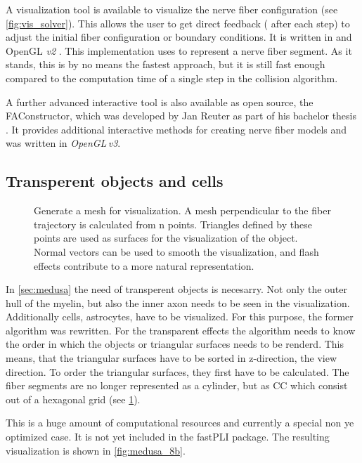 %
A visualization tool is available to visualize the nerve fiber configuration (see \cref{fig:vis_solver}).
This allows the user to get direct feedback (\eg{} after each step) to adjust the initial fiber configuration or boundary conditions.
It is written in \cpp{} and \ac{OpenGL} \textit{v2} \cite{isocpp, khronos}.
This implementation uses  to represent a nerve fiber segment.
As it stands, this is by no means the fastest approach, but it is still fast enough compared to the computation time of a single step in the collision algorithm.
\par
% 
A further advanced interactive tool is also available as open source, the FAConstructor, which was developed by Jan Reuter as part of his bachelor thesis \cite{Reuter2019}.
It provides additional interactive methods for creating nerve fiber models and was written in \textit{OpenGL\,v3}.
\subsection{Transperent objects and cells}
%
\begin{figure}[!t]
    \centering
    \setlength{\tikzwidth}{0.75\textwidth}
	\caption{Generate a mesh for visualization. A mesh perpendicular to the fiber trajectory is calculated from n points. Triangles defined by these points are used as surfaces for the visualization of the object. Normal vectors can be used to smooth the visualization, and flash effects contribute to a more natural representation.}
	\label{fig:vis_mesh}
\end{figure}
%
In \cref{sec:medusa} the need of transperent objects is necesarry.
Not only the outer hull of the myelin, but also the inner axon needs to be seen in the visualization.
Additionally cells, \eg{} astrocytes, have to be visualized.
For this purpose, the former algorithm was rewritten.
For the transparent effects the algorithm needs to know the order in which the objects or triangular surfaces needs to be renderd.
This means, that the triangular surfaces have to be sorted in z-direction, \ie{} the view direction.
To order the triangular surfaces, they first have to be calculated.
The fiber segments are no longer represented as a cylinder, but as \ac{CC} which consist out of a hexagonal grid (see \cref{fig:vis_mesh}).
\par
% 
This is a huge amount of computational resources and currently a special non ye optimized case.
It is not yet included in the \ac{fastPLI} package.
The resulting visualization is shown in \cref{fig:medusa_8b}.
% 
% 
% 
